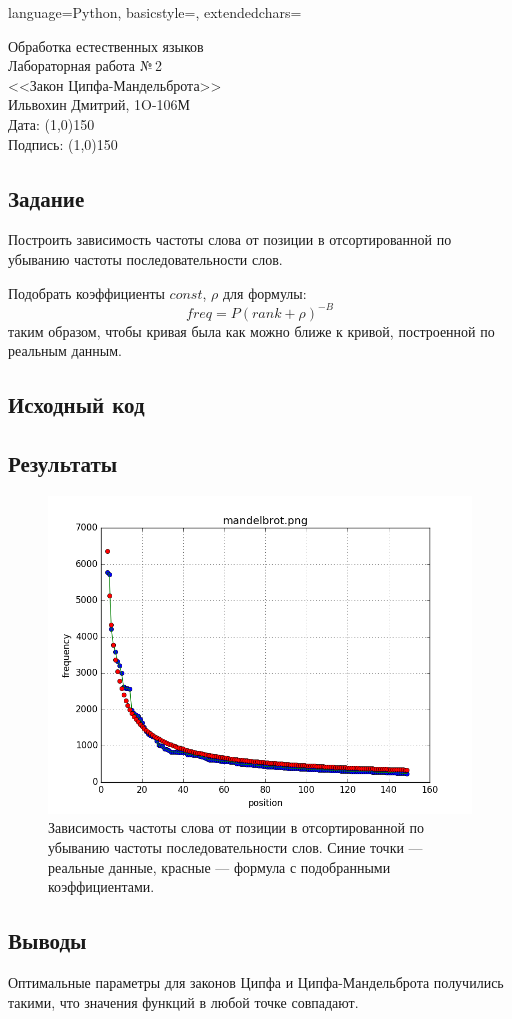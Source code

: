 \documentclass[12pt]{article}
\newcommand{\StudentName}{Ильвохин Дмитрий}
\newcommand{\Group}{1O-106М}
\newcommand{\CourseName}{Обработка естественных языков}
\newcommand{\LabNum}{2}
\newcommand{\Subject}{Закон Ципфа-Мандельброта}
\begin{document}
\lstset
{
        language=Python,
        basicstyle=\footnotesize,%
        extendedchars=\true
}

\begin{flushright}
\Large{
	\CourseName \\
	Лабораторная работа №\,\LabNum \\
	<<\Subject>> \\
  \StudentName, \Group \\
  Дата: \line(1,0){150} \\
  Подпись: \line(1,0){150} \\
}
\end{flushright}

\subsection*{Задание}
Построить зависимость частоты слова от позиции в отсортированной
по убыванию частоты последовательности слов.

Подобрать коэффициенты $const$, $\rho$ для формулы:
$$
freq = P(rank + \rho)^{-B}
$$
таким образом, чтобы кривая была как можно ближе к кривой, построенной
по реальным данным.

\subsection*{Исходный код}


\subsection*{Результаты}


\begin{figure}[!htb]
  \centering
  \includegraphics[scale=0.8]{pics/mandelbrot.png}
  \caption{Зависимость частоты слова от позиции в отсортированной по
    убыванию частоты последовательности слов. Синие точки --- реальные данные,
    красные --- формула с подобранными коэффициентами.}
  \label{fig:mandelbrot}
\end{figure}

\subsection*{Выводы}
Оптимальные параметры для законов Ципфа и Ципфа-Мандельброта
получились такими, что значения функций в любой точке совпадают.
\end{document}
